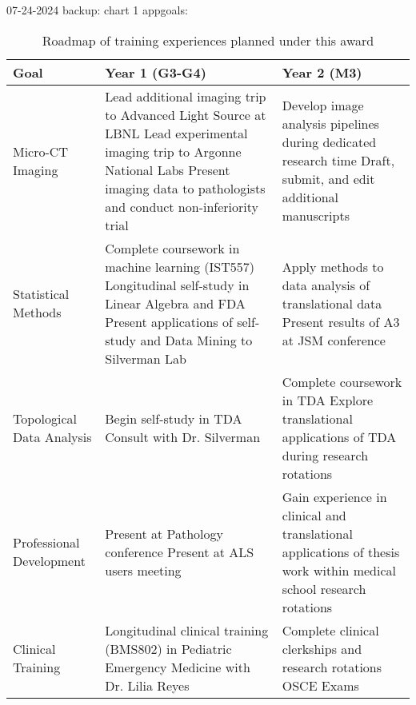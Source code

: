 07-24-2024 backup:
chart 1 appgoals:
\begin{table}[h]
\centering
\begin{tabularx}{\textwidth}{|l|X|X|}
    \hline
    \textbf{Goal} & \textbf{Year 1 (G3-G4)} & \textbf{Year 2 (M3)} \\
    \hline
    Micro-CT Imaging &
    Lead additional imaging trip to Advanced Light Source at LBNL \newline
                       Lead experimental imaging trip to Argonne National Labs \newline
                                    Present imaging data to pathologists and conduct non-inferiority trial &
    Develop image analysis pipelines during dedicated research time \newline
    Draft, submit, and edit additional manuscripts \\
    \hline
    Statistical Methods &
                          Complete coursework in machine learning (IST557) \newline
                          Longitudinal self-study in Linear Algebra and FDA \newline
                                    Present applications of self-study and Data Mining to Silverman Lab &
                                Apply methods to data analysis of translational data \newline
                                Present results of A3 at JSM conference \\
    \hline
    Topological Data Analysis &
    Begin self-study in TDA \newline
    Consult with Dr. Silverman &
    Complete coursework in TDA \newline
    Explore translational applications of TDA during research rotations \\
    \hline
    Professional Development &
    Present at Pathology conference \newline
                               Present at ALS users meeting &
                                                Gain experience in clinical and translational applications of thesis work within medical school research rotations \\
    \hline
  Clinical Training &
                      Longitudinal clinical training (BMS802) in Pediatric Emergency Medicine with Dr. Lilia Reyes &
    Complete clinical clerkships and research rotations \newline
    OSCE Exams \\
    \hline
\end{tabularx}
\caption{Roadmap of training experiences planned under this award}
\label{tab:goals}
\end{table}

